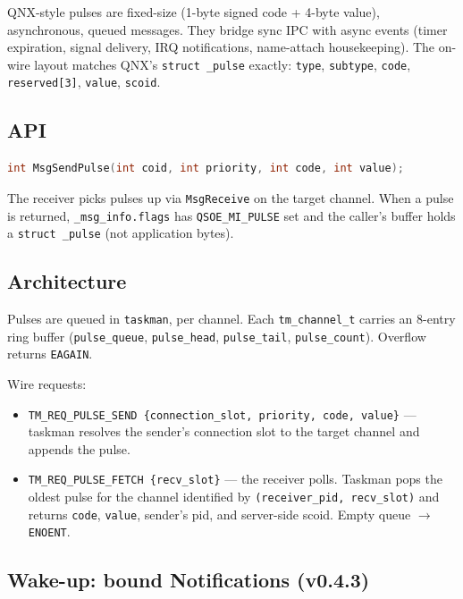 QNX-style pulses are fixed-size (1-byte signed code + 4-byte value),
asynchronous, queued messages.  They bridge sync IPC with async events
(timer expiration, signal delivery, IRQ notifications, name-attach
housekeeping).  The on-wire layout matches QNX's \texttt{struct
\_pulse} exactly: \texttt{type}, \texttt{subtype}, \texttt{code},
\texttt{reserved[3]}, \texttt{value}, \texttt{scoid}.

\subsection{API}

\begin{lstlisting}[language=C]
int MsgSendPulse(int coid, int priority, int code, int value);
\end{lstlisting}

The receiver picks pulses up via \texttt{MsgReceive} on the target
channel.  When a pulse is returned, \texttt{\_msg\_info.flags} has
\texttt{QSOE\_MI\_PULSE} set and the caller's buffer holds a
\texttt{struct \_pulse} (not application bytes).

\subsection{Architecture}

Pulses are queued in \texttt{taskman}, per channel.  Each
\texttt{tm\_channel\_t} carries an 8-entry ring buffer
(\texttt{pulse\_queue}, \texttt{pulse\_head}, \texttt{pulse\_tail},
\texttt{pulse\_count}).  Overflow returns \texttt{EAGAIN}.

Wire requests:

\begin{itemize}
    \item \texttt{TM\_REQ\_PULSE\_SEND \{connection\_slot, priority,
          code, value\}} --- taskman resolves the sender's connection
          slot to the target channel and appends the pulse.
    \item \texttt{TM\_REQ\_PULSE\_FETCH \{recv\_slot\}} --- the
          receiver polls.  Taskman pops the oldest pulse for the
          channel identified by \texttt{(receiver\_pid, recv\_slot)}
          and returns \texttt{code}, \texttt{value}, sender's pid, and
          server-side scoid.  Empty queue $\to$ \texttt{ENOENT}.
\end{itemize}

\subsection{Wake-up: bound Notifications (v0.4.3)}

